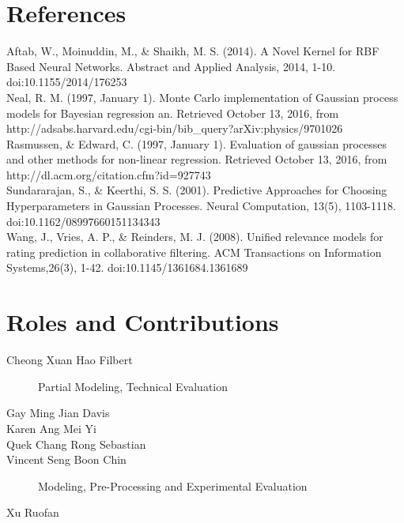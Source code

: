 \documentclass[letterpaper]{article}
\begin{document}
\section{References}

Aftab, W., Moinuddin, M., \& Shaikh, M. S. (2014). A Novel Kernel for RBF Based Neural Networks. Abstract and Applied Analysis, 2014, 1-10. doi:10.1155/2014/176253\\

Neal, R. M. (1997, January 1). Monte Carlo implementation of Gaussian process models for Bayesian regression an. Retrieved October 13, 2016, from http://adsabs.harvard.edu/cgi-bin/bib\_query?arXiv:physics/9701026\\

Rasmussen, \& Edward, C. (1997, January 1). Evaluation of gaussian processes and other methods for non-linear regression. Retrieved October 13, 2016, from http://dl.acm.org/citation.cfm?id=927743\\


Sundararajan, S., \& Keerthi, S. S. (2001). Predictive Approaches for Choosing Hyperparameters in Gaussian Processes. Neural Computation, 13(5), 1103-1118. doi:10.1162/08997660151134343\\

Wang, J., Vries, A. P., \& Reinders, M. J. (2008). Unified relevance models for rating prediction in collaborative filtering. ACM Transactions on Information Systems,26(3), 1-42. doi:10.1145/1361684.1361689\\

\section{Roles and Contributions}


\begin{description}
\item [Cheong Xuan Hao Filbert] Partial Modeling, Technical Evaluation
\item [Gay Ming Jian Davis]
\item [Karen Ang Mei Yi]
\item [Quek Chang Rong Sebastian]
\item [Vincent Seng Boon Chin] Modeling, Pre-Processing and Experimental Evaluation
\item [Xu Ruofan]
\end{description}
\end{document}
